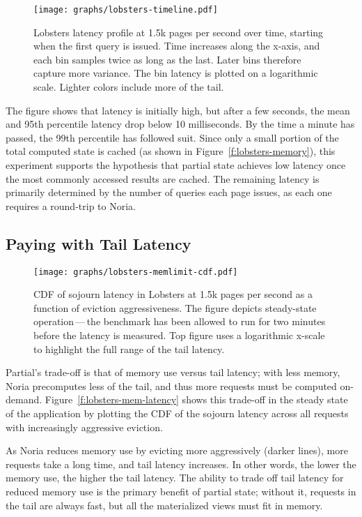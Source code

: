 \begin{figure}[t]
  \centering
  \texttt{[image: graphs/lobsters-timeline.pdf]}
  \caption{Lobsters latency profile at 1.5k pages per second over time, starting
  when the first query is issued. Time increases along the x-axis, and each bin
  samples twice as long as the last. Later bins therefore capture more variance.
  The bin latency is plotted on a logarithmic scale. Lighter colors include more
  of the tail.}
  \label{f:lobsters-timeline}
\end{figure}

The figure shows that latency is initially high, but after a few seconds, the
mean and 95th percentile latency drop below 10 milliseconds. By the time a
minute has passed, the 99th percentile has followed suit. Since only a small
portion of the total computed state is cached (as shown in
Figure~\vref{f:lobsters-memory}), this experiment supports the hypothesis that
partial state achieves low latency once the most commonly accessed results are
cached. The remaining latency is primarily determined by the number of queries
each page issues, as each one requires a round-trip to Noria.

\subsection{Paying with Tail Latency}

\begin{figure}[h]
  \centering
  \texttt{[image: graphs/lobsters-memlimit-cdf.pdf]}
  \caption{CDF of sojourn latency in Lobsters at 1.5k pages per second as
  a function of eviction aggressiveness. The figure depicts steady-state
  operation\,---\,the benchmark has been allowed to run for two minutes before
  the latency is measured. Top figure uses a logarithmic x-scale to highlight
  the full range of the tail latency.}
  \label{f:lobsters-mem-latency}
\end{figure}

Partial's trade-off is that of memory use versus tail latency; with less memory,
Noria precomputes less of the tail, and thus more requests must be computed
on-demand. Figure~\vref{f:lobsters-mem-latency} shows this trade-off in the
steady state of the application by plotting the CDF of the sojourn latency
across all requests with increasingly aggressive eviction.

As Noria reduces memory use by evicting more aggressively (darker lines), more
requests take a long time, and tail latency increases. In other words, the
lower the memory use, the higher the tail latency. The ability to trade off tail
latency for reduced memory use is the primary benefit of partial state; without
it, requests in the tail are always fast, but all the materialized views must
fit in memory.

